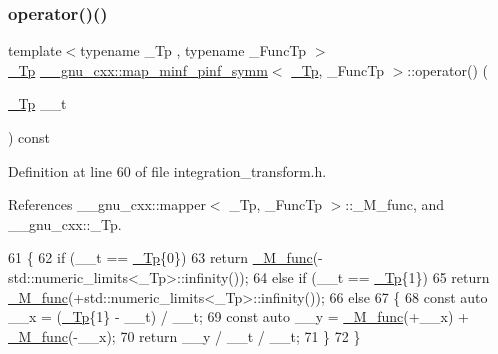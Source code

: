 \subsubsection{\texorpdfstring{operator()()}{operator()()}}
{\footnotesize\ttfamily template$<$typename \+\_\+\+Tp , typename \+\_\+\+Func\+Tp $>$ \\
\hyperlink{namespace____gnu__cxx_a3b19a9c800ca194374ef9172290f7d79}{\+\_\+\+Tp} \hyperlink{struct____gnu__cxx_1_1map__minf__pinf__symm}{\+\_\+\+\_\+gnu\+\_\+cxx\+::map\+\_\+minf\+\_\+pinf\+\_\+symm}$<$ \hyperlink{namespace____gnu__cxx_a3b19a9c800ca194374ef9172290f7d79}{\+\_\+\+Tp}, \+\_\+\+Func\+Tp $>$\+::operator() (\begin{DoxyParamCaption}\item[{\hyperlink{namespace____gnu__cxx_a3b19a9c800ca194374ef9172290f7d79}{\+\_\+\+Tp}}]{\+\_\+\+\_\+t }\end{DoxyParamCaption}) const\hspace{0.3cm}{\ttfamily [inline]}}



Definition at line 60 of file integration\+\_\+transform.\+h.



References \+\_\+\+\_\+gnu\+\_\+cxx\+::mapper$<$ \+\_\+\+Tp, \+\_\+\+Func\+Tp $>$\+::\+\_\+\+M\+\_\+func, and \+\_\+\+\_\+gnu\+\_\+cxx\+::\+\_\+\+Tp.


\begin{DoxyCode}
61       \{
62         \textcolor{keywordflow}{if} (\_\_t == \hyperlink{namespace____gnu__cxx_a3b19a9c800ca194374ef9172290f7d79}{\_Tp}\{0\})
63           \textcolor{keywordflow}{return} \hyperlink{struct____gnu__cxx_1_1map__minf__pinf__symm_a3e6d1d72fb8471f11573dc8b6ce835c6}{\_M\_func}(-std::numeric\_limits<\_Tp>::infinity());
64         \textcolor{keywordflow}{else} \textcolor{keywordflow}{if} (\_\_t == \hyperlink{namespace____gnu__cxx_a3b19a9c800ca194374ef9172290f7d79}{\_Tp}\{1\})
65           \textcolor{keywordflow}{return} \hyperlink{struct____gnu__cxx_1_1map__minf__pinf__symm_a3e6d1d72fb8471f11573dc8b6ce835c6}{\_M\_func}(+std::numeric\_limits<\_Tp>::infinity());
66         \textcolor{keywordflow}{else}
67           \{
68             \textcolor{keyword}{const} \textcolor{keyword}{auto} \_\_x = (\hyperlink{namespace____gnu__cxx_a3b19a9c800ca194374ef9172290f7d79}{\_Tp}\{1\} - \_\_t) / \_\_t;
69             \textcolor{keyword}{const} \textcolor{keyword}{auto} \_\_y = \hyperlink{struct____gnu__cxx_1_1map__minf__pinf__symm_a3e6d1d72fb8471f11573dc8b6ce835c6}{\_M\_func}(+\_\_x) + \hyperlink{struct____gnu__cxx_1_1map__minf__pinf__symm_a3e6d1d72fb8471f11573dc8b6ce835c6}{\_M\_func}(-\_\_x);
70             \textcolor{keywordflow}{return} \_\_y / \_\_t / \_\_t;
71           \}
72       \}
\end{DoxyCode}



